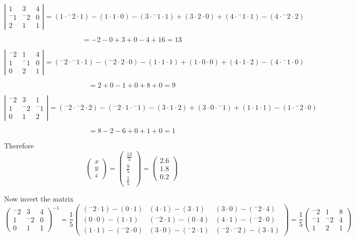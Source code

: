 \documentclass{article}
\def\cramersMatrix#1#2#3#4#5#6#7#8#9{
  \def\a{{#1}}
  \def\b{{#2}}
  \def\c{{#3}}
  \def\d{{#4}}
  \def\e{{#5}}
  \def\f{{#6}}
  \def\g{{#7}}
  \def\h{{#8}}
  \def\i{{#9}}
}
\newcommand{\determinant}[9]
{
\cramersMatrix{#1}{#2}{#3}{#4}{#5}{#6}{#7}{#8}{#9}
\[
	\left|
		\begin{array}{ccc}
			\a & \b & \c \\
			\d & \e & \f \\
			\g & \h & \i
		\end{array}
	\right|
	= (\a \cdot \e \cdot \i) - (\a \cdot \h \cdot \f) - (\b \cdot \d \cdot \i) + (\b \cdot \g \cdot \f) + (\c \cdot \d \cdot \h) - (\c \cdot \e \cdot \g)
\]
}
\begin{document}
\begin{enumerate}
\begin{enumerate}[i.]
\determinant{1}{3}{4}{{^-}1}{{^-}2}{0}{2}{1}{1}
\[
	= -2 - 0 + 3 + 0 - 4 + 16 = 13
\]

\determinant{{^-}2}{1}{4}{1}{{^-}1}{0}{0}{2}{1}
\[
	= 2 + 0 - 1 + 0 + 8 + 0 = 9
\]

\determinant{{^-}2}{3}{1}{1}{{^-}2}{{^-}1}{0}{1}{2}
\[
	= 8 - 2 - 6 + 0 +1 + 0 = 1
\]

Therefore
\[
	\left(
		\begin{array}{c}
			x \\
			y \\
			z
		\end{array}
	\right)
	=
	\left(
		\begin{array}{c}
			\frac{13}{5} \\
			\frac{9}{5} \\
			\frac{1}{5}
		\end{array}
	\right)
	=
	\left(
		\begin{array}{c}
			2.6 \\
			1.8 \\
			0.2
		\end{array}
	\right)
\]

Now invert the matrix
\[
	\left(
		\begin{array}{ccc}
			{^-}2 &        3 & 4 \\
			       1 & {^-}2 & 0 \\
			       0 &        1 & 1
		\end{array}
	\right)^{-1}
	=
	\frac{1}{5}
	\left(
		\begin{array}{ccc}
			({^-}2 \cdot 1)-(0         \cdot 1) & (       4 \cdot 1)-(       3 \cdot 1) & (       3 \cdot         0)-({^-}2  \cdot 4) \\
			(       0  \cdot 0)-(1        \cdot 1) & ({^-}2 \cdot 1)-(       0 \cdot 4) & (       4 \cdot         1)-({^-}2 \cdot 0) \\
			(       1  \cdot 1)-({^-}2 \cdot 0) & (       3 \cdot 0)-({^-}2 \cdot 1) & ({^-}2 \cdot {^-}2)-(        3 \cdot 1)
		\end{array}
	\right)
	=
	\frac{1}{5}
	\left(
		\begin{array}{ccc}
			{^-}2 &        1 & 8 \\
			{^-}1 & {^-}2 & 4 \\
			1        &         2 & 1
		\end{array}	
	\right)
\]


\end{enumerate}
\end{enumerate}
\end{document}

